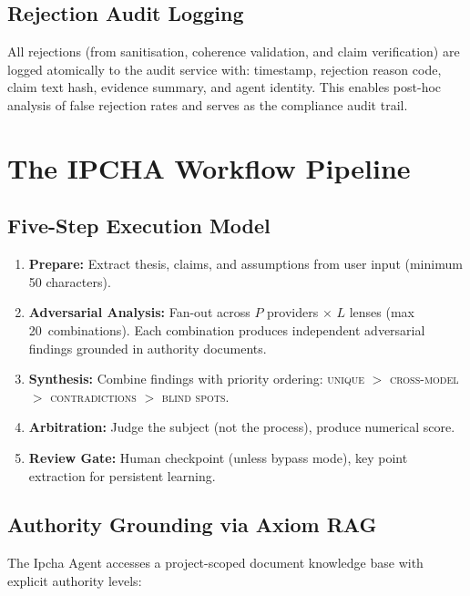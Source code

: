\documentclass[11pt,a4paper]{article}
\begin{document}
\subsection{Rejection Audit Logging}

All rejections (from sanitisation, coherence validation, and claim
verification) are logged atomically to the audit service with:
timestamp, rejection reason code, claim text hash, evidence summary,
and agent identity.  This enables post-hoc analysis of false
rejection rates and serves as the compliance audit trail.

\section{The IPCHA Workflow Pipeline}\label{sec:pipeline}

\subsection{Five-Step Execution Model}

\begin{enumerate}[leftmargin=*]
  \item \textbf{Prepare:} Extract thesis, claims, and assumptions
        from user input (minimum 50 characters).
  \item \textbf{Adversarial Analysis:} Fan-out across $P$ providers
        $\times$ $L$ lenses (max 20~combinations).  Each combination
        produces independent adversarial findings grounded in
        authority documents.
  \item \textbf{Synthesis:} Combine findings with priority ordering:
        \textsc{unique} $>$ \textsc{cross-model} $>$
        \textsc{contradictions} $>$ \textsc{blind spots}.
  \item \textbf{Arbitration:} Judge the subject (not the process),
        produce numerical score.
  \item \textbf{Review Gate:} Human checkpoint (unless bypass mode),
        key point extraction for persistent learning.
\end{enumerate}

\subsection{Authority Grounding via Axiom RAG}

The Ipcha Agent accesses a project-scoped document knowledge base
with explicit authority levels:
\end{document}
